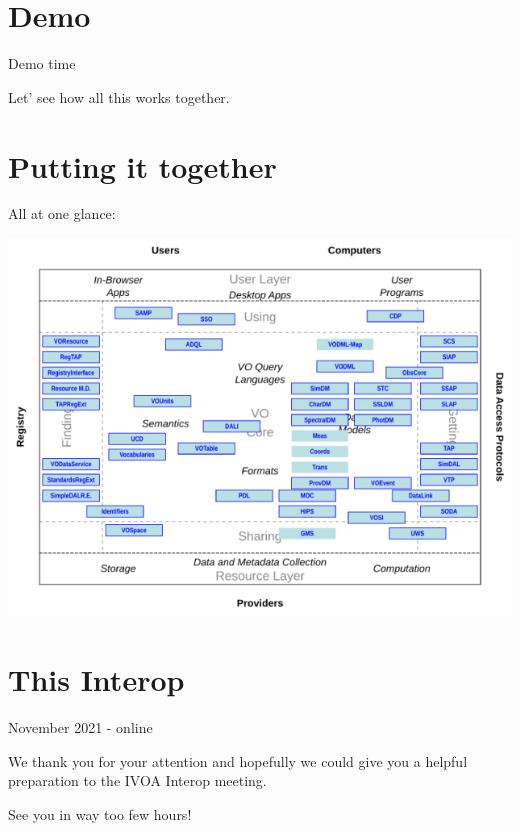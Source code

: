 \documentclass{beamer}
\begin{document}
\section{Demo}

\begin{frame}{Demo time}

Let' see how all this works together.

\end{frame}



\section{Putting it together}

\begin{frame}{All at one glance:}

\includegraphics[width=\linewidth]{archdiag2.png}
\end{frame}


\section{This Interop}

\begin{frame}{November 2021 - online}

We thank you for your attention and hopefully we could give you a
helpful preparation to the IVOA Interop meeting. 

See you in way too few hours! 

\end{frame}
\end{document}
